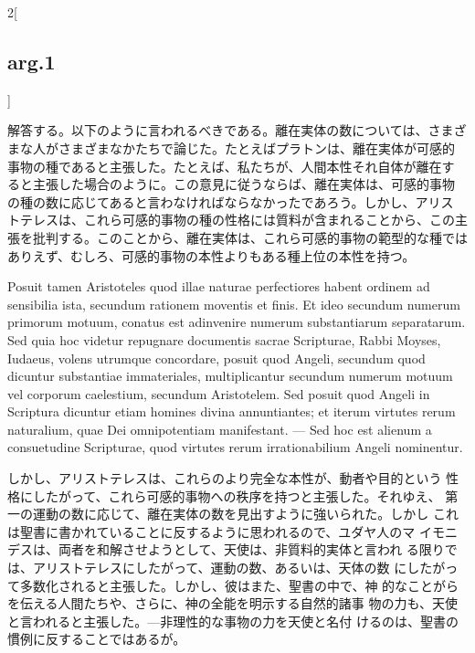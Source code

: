 \documentclass[paper=a4paper,fontsize=10pt,jafontsize=9pt,titlepage]{jlreq}
\begin{document}
\begin{paracol}{2}[\subsection{arg.1}]
\switchcolumn

解答する。以下のように言われるべきである。離在実体の数については、さまざ
 まな人がさまざまなかたちで論じた。たとえばプラトンは、離在実体が可感的
 事物の種であると主張した。たとえば、私たちが、人間本性それ自体が離在す
 ると主張した場合のように。この意見に従うならば、離在実体は、可感的事物
 の種の数に応じてあると言わなければならなかったであろう。しかし、アリス
 トテレスは、これら可感的事物の種の性格には質料が含まれることから、この主
 張を批判する。このことから、離在実体は、これら可感的事物の範型的な種では
 ありえず、むしろ、可感的事物の本性よりもある種上位の本性を持つ。

\switchcolumn*

Posuit tamen
Aristoteles quod illae naturae perfectiores habent ordinem ad sensibilia
ista, secundum rationem moventis et finis. Et ideo secundum numerum
primorum motuum, conatus est adinvenire numerum substantiarum
separatarum. Sed quia hoc videtur repugnare documentis sacrae
Scripturae, Rabbi Moyses, Iudaeus, volens utrumque concordare, posuit
quod Angeli, secundum quod dicuntur substantiae immateriales,
multiplicantur secundum numerum motuum vel corporum caelestium, secundum
Aristotelem. Sed posuit quod Angeli in Scriptura dicuntur etiam homines
divina annuntiantes; et iterum virtutes rerum naturalium, quae Dei
omnipotentiam manifestant. --- Sed hoc est alienum a consuetudine
Scripturae, quod virtutes rerum irrationabilium Angeli nominentur.

\switchcolumn

しかし、アリストテレスは、これらのより完全な本性が、動者や目的という
 性格にしたがって、これら可感的事物への秩序を持つと主張した。それゆえ、
 第一の運動の数に応じて、離在実体の数を見出すように強いられた。しかし
 これは聖書に書かれていることに反するように思われるので、ユダヤ人のマ
 イモニデスは、両者を和解させようとして、天使は、非質料的実体と言われ
 る限りでは、アリストテレスにしたがって、運動の数、あるいは、天体の数
 にしたがって多数化されると主張した。しかし、彼はまた、聖書の中で、神
 的なことがらを伝える人間たちや、さらに、神の全能を明示する自然的諸事
 物の力も、天使と言われると主張した。---非理性的な事物の力を天使と名付
 けるのは、聖書の慣例に反することではあるが。

\switchcolumn*


\end{paracol}
\end{document}
